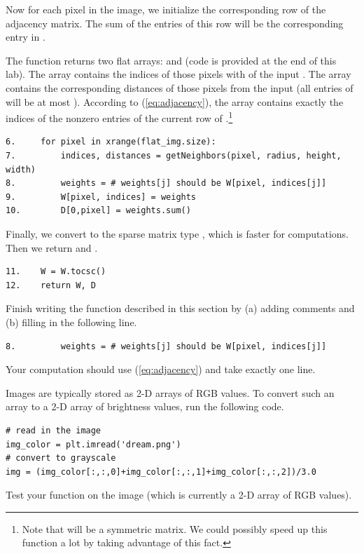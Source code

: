 Now for each pixel in the image, we initialize the corresponding row of the adjacency matrix. 
The sum of the entries of this row will be the corresponding entry in . 

The function  returns two flat arrays:  and  (code is provided at the end of this lab). The array  contains the indices of those pixels with  of the input . The array  contains the corresponding distances of those pixels from the input  (all entries of  will be at most ). According to (\ref{eq:adjacency}), the array  contains exactly the indices of the nonzero entries of the current row of .\footnote{Note that  will be a symmetric matrix. We could possibly speed up this function a lot by taking advantage of this fact.}

\begin{lstlisting}
6.     for pixel in xrange(flat_img.size):
7.         indices, distances = getNeighbors(pixel, radius, height, width)
8.         weights = # weights[j] should be W[pixel, indices[j]]
9.         W[pixel, indices] = weights
10.        D[0,pixel] = weights.sum()
\end{lstlisting}

Finally, we convert  to the sparse matrix type , which is faster for computations. Then we return  and . 
\begin{lstlisting}
11.    W = W.tocsc()
12.    return W, D
\end{lstlisting}


\begin{problem}
Finish writing the function  described in this section by (a) adding comments and (b) filling in the following line.
\begin{lstlisting}
8.         weights = # weights[j] should be W[pixel, indices[j]]
\end{lstlisting}
Your computation should use (\ref{eq:adjacency}) and take exactly one line.

Images are typically stored as 2-D arrays of RGB values. To convert such an array to a 2-D array of brightness values, run the following code.
\begin{lstlisting}
# read in the image
img_color = plt.imread('dream.png')
# convert to grayscale
img = (img_color[:,:,0]+img_color[:,:,1]+img_color[:,:,2])/3.0
\end{lstlisting}
Test your function on the image  (which is currently a 2-D array of RGB values).


\label{prob:adjacency_dream}
\end{problem}

